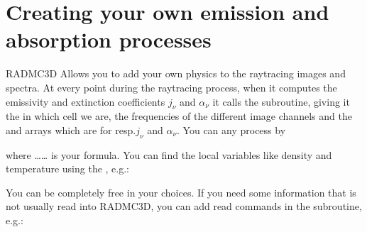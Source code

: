 \documentclass[letterpaper,10pt,english]{sphinxmanual}
\begin{document}
\section{Creating your own emission and absorption processes}
\label{\detokenize{internalsetup:creating-your-own-emission-and-absorption-processes}}
RADMC\sphinxhyphen{}3D Allows you to add your own physics to the ray\sphinxhyphen{}tracing images and
spectra. At every point during the ray\sphinxhyphen{}tracing process, when it computes the
emissivity and extinction coefficients \(j_\nu\) and \(\alpha_\nu\) it
calls the  subroutine, giving it the  in which cell
we are, the frequencies of the different image channels and the  and
 arrays which are for resp.\(j_\nu\) and \(\alpha_\nu\). You
can  any process by

\begin{sphinxVerbatim}[commandchars=\\\{\}]
    
    
\end{sphinxVerbatim}

where …… is your formula. You can find the local variables like
density and temperature using the , e.g.:

\begin{sphinxVerbatim}[commandchars=\\\{\}]
  
\end{sphinxVerbatim}

You can be completely free in your choices. If you need some information
that is not usually read into RADMC\sphinxhyphen{}3D, you can add read commands in the
 subroutine, e.g.:

\begin{sphinxVerbatim}[commandchars=\\\{\}]
 
\end{sphinxVerbatim}
\end{document}
